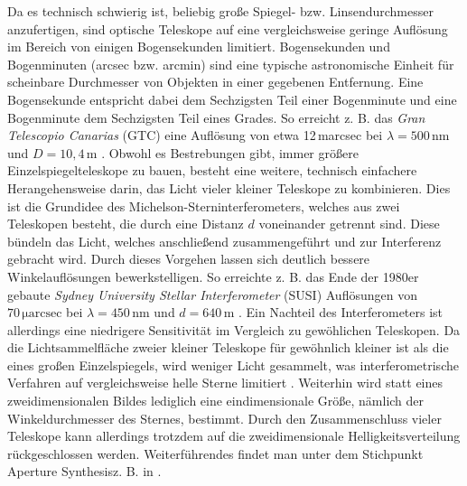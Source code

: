 Da es technisch schwierig ist, beliebig große Spiegel- bzw. Linsendurchmesser anzufertigen, sind optische Teleskope auf eine vergleichsweise geringe Auflösung im Bereich von einigen Bogensekunden limitiert. 
Bogensekunden und Bogenminuten (arcsec bzw. arcmin) sind eine typische astronomische Einheit für scheinbare Durchmesser von Objekten in einer gegebenen Entfernung. 
Eine Bogensekunde entspricht dabei dem Sechzigsten Teil einer Bogenminute und eine Bogenminute dem Sechzigsten Teil eines Grades. 
So erreicht z. B. das \emph{Gran Telescopio Canarias} (GTC) eine Auflösung von etwa 12\,marcsec bei $\lambda=500\,\mathrm{nm}$ und $D=10{,}4\,\mathrm{m}$ \cite{GranTelescopioCANARIAS}. 
Obwohl es Bestrebungen gibt, immer größere Einzelspiegelteleskope zu bauen, besteht eine weitere, technisch einfachere Herangehensweise darin, das Licht vieler kleiner Teleskope zu kombinieren. 
Dies ist die Grundidee des Michelson-Sterninterferometers, welches aus zwei Teleskopen besteht, die durch eine Distanz $d$ voneinander getrennt sind. 
Diese bündeln das Licht, welches anschließend zusammengeführt und zur Interferenz gebracht wird. 
Durch dieses Vorgehen lassen sich deutlich bessere Winkelauflösungen bewerkstelligen. 
So erreichte z. B. das Ende der 1980er gebaute \emph{Sydney University Stellar Interferometer} (SUSI) Auflösungen von $70\,\mathrm{\mu arcsec}$ bei $\lambda=450\,\mathrm{nm}$ und $d=640\,\mathrm{m}$ \cite{davisSydneyUniversityStellar1999}. 
Ein Nachteil des Interferometers ist allerdings eine niedrigere Sensitivität im Vergleich zu gewöhlichen Teleskopen. 
Da die Lichtsammelfläche zweier kleiner Teleskope für gewöhnlich kleiner ist als die eines großen Einzelspiegels, wird weniger Licht gesammelt, was interferometrische Verfahren auf vergleichsweise helle Sterne limitiert \cite[Kap. 6.1]{foxQuantumOpticsIntroduction2006}. 
Weiterhin wird statt eines zweidimensionalen Bildes lediglich eine eindimensionale Größe, nämlich der Winkeldurchmesser des Sternes, bestimmt. 
Durch den Zusammenschluss vieler Teleskope kann allerdings trotzdem auf die zweidimensionale Helligkeitsverteilung rückgeschlossen werden. 
Weiterführendes findet man unter dem Stichpunkt \glqq Aperture Synthesis\grqq\;z. B. in \cite[Kap. 10]{burkeIntroductionRadioAstronomy2019}. \\

